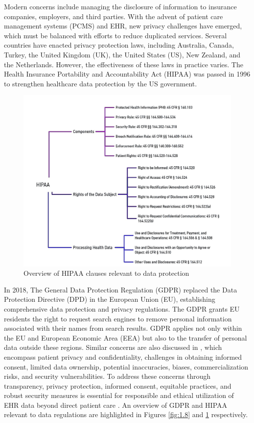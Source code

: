 \documentclass{article}
\begin{document}
Modern concerns include managing the disclosure of information to insurance companies, employers, and third parties. With the advent of patient care management systems (PCMS) and EHR, new privacy challenges have emerged, which must be balanced with efforts to reduce duplicated services. Several countries have enacted privacy protection laws, including Australia, Canada, Turkey, the United Kingdom (UK), the United States (US), New Zealand, and the Netherlands. However, the effectiveness of these laws in practice varies. The Health Insurance Portability and Accountability Act (HIPAA) \cite{usahipaa96} was passed in 1996 to strengthen healthcare data protection by the US government. 

\begin{figure}[!htb]
\centering
\includegraphics[scale=0.7]{HIPAA.jpg}
\caption{\label{fig:1.9}Overview of HIPAA clauses relevant to data protection}
\end{figure}

In 2018, The General Data Protection Regulation (GDPR) \cite{europaEURLex32016R0679} replaced the Data Protection Directive (DPD) in the European Union (EU), establishing comprehensive data protection and privacy regulations. The GDPR grants EU residents the right to request search engines to remove personal information associated with their names from search results. GDPR applies not only within the EU and European Economic Area (EEA) but also to the transfer of personal data outside these regions. Similar concerns are also discussed in \cite{9146114}, which encompass patient privacy and confidentiality, challenges in obtaining informed consent, limited data ownership, potential inaccuracies, biases, commercialization risks, and security vulnerabilities. To address these concerns through transparency, privacy protection, informed consent, equitable practices, and robust security measures is essential for responsible and ethical utilization of EHR data beyond direct patient care \cite{porsdam2016facilitating}. An overview of GDPR and HIPAA relevant to data regulations are highlighted in Figures \ref{fig:1.8} and \ref{fig:1.9} respectively.
\end{document}
